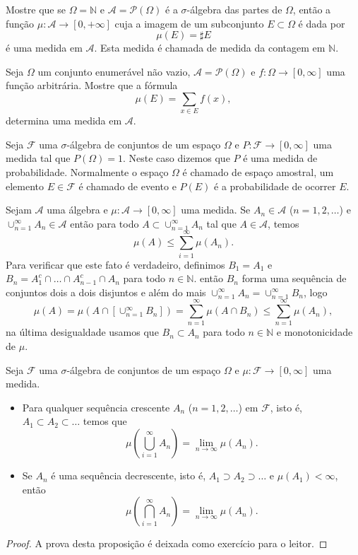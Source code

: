 \begin{exercicio}
 Mostre que se $\Omega=\mathbb{N}$ e $\mathcal{A}= \mathcal{P}(\Omega) $ é a $\sigma$-álgebra das partes de 
 $\Omega$, então a função $\mu:\mathcal{A}\to [0,+\infty]$ cuja a imagem de um subconjunto 
 $E\subset\Omega$ é dada por 
 \[
     \mu(E)=\sharp E
 \]
 é uma medida em $\mathcal{A}$. Esta medida é chamada de medida da contagem em $\mathbb{N}$.
\end{exercicio}

\begin{exercicio}
	Seja $\Omega$ um conjunto enumerável não vazio, $\mathcal{A}=\mathcal{P}(\Omega)$ e
	 $f:\Omega\to [0,\infty]$ 
	uma função arbitrária. Mostre que a fórmula 
	\[
	    \mu(E)=\sum_{x\in E} f(x),
	\]
	determina uma medida em $\mathcal{A}$.
\end{exercicio}


\begin{definicao}
Seja $\mathcal{F}$ uma $\sigma$-álgebra de conjuntos de um espaço $\Omega$ e 
$P:\mathcal{F}\to [0,\infty]$ uma medida tal que $P(\Omega)=1$.
Neste caso dizemos que $P$ é uma medida de probabilidade. 
Normalmente o espaço $\Omega$
é chamado de espaço amostral, um elemento $E\in\mathcal{F}$ é chamado
de evento e $P(E)$ é a probabilidade de ocorrer $E$.
\end{definicao}


Sejam $\mathcal{A}$ uma álgebra e $\mu:\mathcal{A}\to [0,\infty]$ uma medida.
Se $A_n\in\mathcal{A}$ ($n=1,2,\ldots$) e
$\cup_{n=1}^{\infty} A_n\in\mathcal{A}$ 
então para todo $A\subset \cup_{n=1}^{\infty} A_n$ tal que $A\in\mathcal{A}$, temos 
$$
\mu(A) \leq \sum_{i=1}^{\infty} \mu(A_n).
$$
Para verificar que este fato é verdadeiro, definimos $B_1=A_1$
e $B_n = A_1^c\cap \ldots \cap A_{n-1}^c\cap A_n$ para todo $n\in\mathbb{N}$.
então $B_n$ forma uma sequência de conjuntos dois a dois disjuntos e além do
mais $\cup_{n=1}^{\infty} A_n=\cup_{n=1}^{\infty} B_n$, logo 
$$
\mu(A) 	= \mu(A\cap [\cup_{n=1}^{\infty} B_n])
		= \sum_{n=1}^{\infty} \mu(A\cap B_n)
		\leq \sum_{n=1}^{\infty} \mu(A_n),
$$
na última desigualdade usamos que $B_n\subset A_n$ para todo $n\in\mathbb{N}$
e monotonicidade de $\mu$. 


\begin{proposicao}
Seja $\mathcal{F}$ uma $\sigma$-álgebra de conjuntos de um espaço $\Omega$ e 
$\mu:\mathcal{F}\to [0,\infty]$ uma medida. 
\begin{itemize}
\item Para qualquer sequência crescente $A_n$
($n=1,2,\ldots$) em $\mathcal{F}$, isto é,  
$A_1\subset A_2\subset\ldots$ temos que 
$$
\mu\left( \bigcup_{i=1}^{\infty} A_n \right) = \lim_{n\to\infty} \mu(A_n).
$$ 
\item Se $A_n$ é uma sequência decrescente, isto é, 
$A_1\supset A_2\supset\ldots$ e $\mu(A_1)<\infty$, então 
$$
\mu\left( \bigcap_{i=1}^{\infty} A_n \right) = \lim_{n\to\infty} \mu(A_n).
$$ 
\end{itemize}
\end{proposicao}
\begin{proof}
A prova desta proposição é deixada como exercício para o leitor.
\end{proof}


